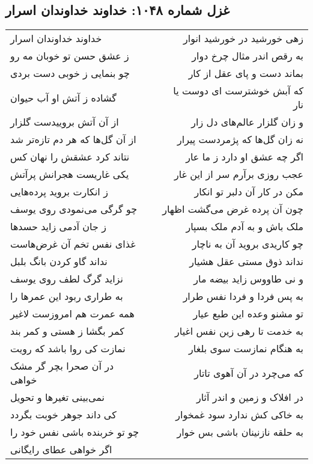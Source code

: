 \begin{center}
\section*{غزل شماره ۱۰۴۸: خداوند خداوندان اسرار}
\label{sec:1048}
\begin{longtable}{l p{0.5cm} r}
خداوند خداوندان اسرار
&&
زهی خورشید در خورشید انوار
\\
ز عشق حسن تو خوبان مه رو
&&
به رقص اندر مثال چرخ دوار
\\
چو بنمایی ز خوبی دست بردی
&&
بماند دست و پای عقل از کار
\\
گشاده ز آتش او آب حیوان
&&
که آبش خوشترست ای دوست یا نار
\\
از آن آتش بروییدست گلزار
&&
و زان گلزار عالم‌های دل زار
\\
از آن گل‌ها که هر دم تازه‌تر شد
&&
نه زان گل‌ها که پژمردست پیرار
\\
نتاند کرد عشقش را نهان کس
&&
اگر چه عشق او دارد ز ما عار
\\
یکی غاریست هجرانش پرآتش
&&
عجب روزی برآرم سر از این غار
\\
ز انکارت بروید پرده‌هایی
&&
مکن در کار آن دلبر تو انکار
\\
چو گرگی می‌نمودی روی یوسف
&&
چون آن پرده غرض می‌گشت اظهار
\\
ز جان آدمی زاید حسدها
&&
ملک باش و به آدم ملک بسپار
\\
غذای نفس تخم آن غرض‌هاست
&&
چو کاریدی بروید آن به ناچار
\\
نداند گاو کردن بانگ بلبل
&&
نداند ذوق مستی عقل هشیار
\\
نزاید گرگ لطف روی یوسف
&&
و نی طاووس زاید بیضه مار
\\
به طراری ربود این عمرها را
&&
به پس فردا و فردا نفس طرار
\\
همه عمرت هم امروزست لاغیر
&&
تو مشنو وعده این طبع عیار
\\
کمر بگشا ز هستی و کمر بند
&&
به خدمت تا رهی زین نفس اغیار
\\
نمازت کی روا باشد که رویت
&&
به هنگام نمازست سوی بلغار
\\
در آن صحرا بچر گر مشک خواهی
&&
که می‌چرد در آن آهوی تاتار
\\
نمی‌بینی تغیرها و تحویل
&&
در افلاک و زمین و اندر آثار
\\
کی داند جوهر خوبت بگردد
&&
به خاکی کش ندارد سود غمخوار
\\
چو تو خربنده باشی نفس خود را
&&
به حلقه نازنینان باشی بس خوار
\\
اگر خواهی عطای رایگانی

\end{longtable}
\end{center}
